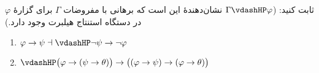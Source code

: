 ثابت کنید: ($\Gamma \vdashHP \varphi$ نشان‌دهندهٔ این است که برهانی با مفروضات $\Gamma$ برای گزارهٔ $\varphi$ در دستگاه استنتاج هیلبرت وجود دارد.)
\begin{enumerate}[label=(\alph*)]
  \item $\varphi \rightarrow \psi \dashv\vdashHP \neg\psi \rightarrow \neg\varphi$
  \item $\vdashHP \big(\varphi \rightarrow (\psi \rightarrow \theta)\big) \rightarrow \big((\varphi \rightarrow \psi) \rightarrow (\varphi \rightarrow \theta)\big)$
\end{enumerate}

